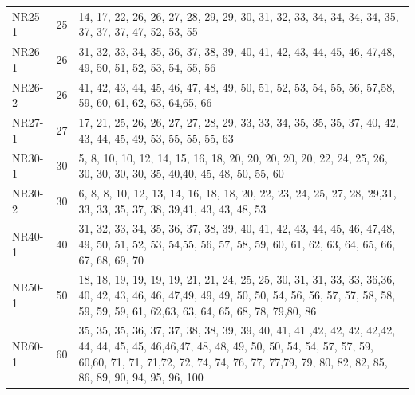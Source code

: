 \documentclass[12pt,a4paper,oneside]{book}
\begin{document}
{\begin{tabularx}{\textwidth}{ l c X }
NR25-1 & 25 & 14, 17, 22, 26, 26, 27, 28, 29, 29, 30, 31, 32, 33, 34, 34, 34, 34, 35, 37, 37, 37, 47, 52, 53, 55 \\
NR26-1 & 26 & 31, 32, 33, 34, 35, 36, 37, 38, 39, 40, 41, 42, 43, 44, 45, 46, 47,48, 49, 50, 51, 52, 53, 54, 55, 56 \\
NR26-2 & 26 & 41, 42, 43, 44, 45, 46, 47, 48, 49, 50, 51, 52, 53, 54, 55, 56, 57,58, 59, 60, 61, 62, 63, 64,65, 66 \\
NR27-1 & 27 & 17, 21, 25, 26, 26, 27, 27, 28, 29, 33, 33, 34, 35, 35, 35, 37, 40, 42, 43, 44, 45, 49, 53, 55, 55, 55, 63 \\
NR30-1 & 30 & 5, 8, 10, 10, 12, 14, 15, 16, 18, 20, 20, 20, 20, 20, 22, 24, 25, 26, 30, 30, 30, 30, 35, 40,40, 45, 48, 50, 55, 60 \\
NR30-2 & 30 & 6, 8, 8, 10, 12, 13, 14, 16, 18, 18, 20, 22, 23, 24, 25, 27, 28, 29,31, 33, 33, 35, 37, 38, 39,41, 43, 43, 48, 53 \\
NR40-1 & 40 & 31, 32, 33, 34, 35, 36, 37, 38, 39, 40, 41, 42, 43, 44, 45, 46, 47,48, 49, 50, 51, 52, 53, 54,55, 56, 57, 58, 59, 60, 61, 62, 63, 64, 65, 66, 67, 68, 69, 70 \\
NR50-1 & 50 & 18, 18, 19, 19, 19, 19, 21, 21, 24, 25, 25, 30, 31, 31, 33, 33, 36,36, 40, 42, 43, 46, 46, 47,49, 49, 49, 50, 50, 54, 56, 56, 57, 57, 58, 58, 59, 59, 59, 61, 62,63, 63, 64, 65, 68, 78, 79,80, 86 \\
NR60-1 & 60 & 35, 35, 35, 36, 37, 37, 38, 38, 39, 39, 40, 41, 41 ,42, 42, 42, 42,42, 44, 44, 45, 45, 46,46,47, 48, 48, 49, 50, 50, 54, 54, 57, 57, 59, 60,60, 71, 71, 71,72, 72, 74, 74, 76, 77, 77,79, 79, 80, 82, 82, 85, 86, 89, 90, 94, 95, 96, 100 \\


\end{tabularx}}
\end{document}

